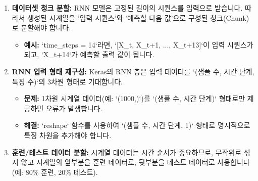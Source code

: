\documentclass[11pt,a4paper]{article}
\begin{document}
\begin{enumerate}
\begin{lstlisting}[language=Python, caption=GARCH 유사 시계열 생성 함수 (개념 코드), label=lst:garch_like_ts]
    for t in range(1, n_steps):
        # GARCH와 유사한 변동성 업데이트
        volatility[t] = np.sqrt(alpha * series[t-1]**2 + beta * volatility[t-1]**2 + gamma)
        # 비선형 상호작용 항 추가
        series[t] = np.random.normal(0, volatility[t]) + interaction * series[t-1] * volatility[t-1]
    return series, volatility
    \end{lstlisting}
    \item \textbf{데이터셋 청크 분할:}
    RNN 모델은 고정된 길이의 시퀀스를 입력으로 받습니다. 따라서 생성된 시계열을 '입력 시퀀스'와 '예측할 다음 값'으로 구성된 청크(Chunk)로 분할해야 합니다.
    \begin{itemize}
        \item \textbf{예시:} `time_steps = 14`라면, `[X_t, X_{t+1}, ..., X_{t+13}]`이 입력 시퀀스가 되고, `X_{t+14}`가 예측할 출력 값이 됩니다.
    \end{itemize}
    \item \textbf{RNN 입력 형태 재구성:}
    Keras의 RNN 층은 입력 데이터를 `(샘플 수, 시간 단계, 특징 수)`의 3차원 형태로 기대합니다.
    \begin{itemize}
        \item \textbf{문제:} 1차원 시계열 데이터(예: `(1000,)`)를 `(샘플 수, 시간 단계)` 형태로만 제공하면 오류가 발생합니다.
        \item \textbf{해결:} `reshape` 함수를 사용하여 `(샘플 수, 시간 단계, 1)` 형태로 명시적으로 특징 차원을 추가해야 합니다.
    \end{itemize}
    \item \textbf{훈련/테스트 데이터 분할:}
    시계열 데이터는 시간 순서가 중요하므로, 무작위로 섞지 않고 시계열의 앞부분을 훈련 데이터로, 뒷부분을 테스트 데이터로 사용합니다 (예: 80\% 훈련, 20\% 테스트).
\end{enumerate}
\end{document}
